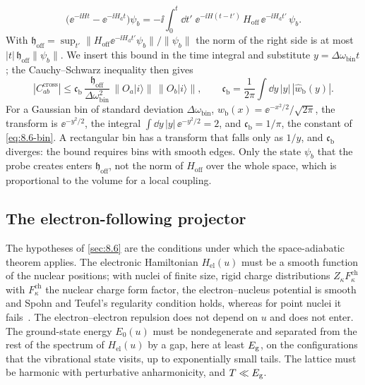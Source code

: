 \begin{equation*}
  \bigl(\ee^{-\ii Ht} - \ee^{-\ii H_{\mathrm{d}}t}\bigr)\psi_b = -\ii\int_0^t\dd t'\;\ee^{-\ii H(t - t')}\,H_{\mathrm{off}}\,\ee^{-\ii H_{\mathrm{d}}t'}\,\psi_b .
\end{equation*}
With $\mathfrak{h}_{\mathrm{off}} = \sup_{t'}\|H_{\mathrm{off}}\ee^{-\ii H_{\mathrm{d}}t'}\psi_b\|/\|\psi_b\|$ the norm of the right side is at most $|t|\,\mathfrak{h}_{\mathrm{off}}\|\psi_b\|$. We insert this bound in the time integral and substitute $y = \Delta\omega_{\mathrm{bin}}t$; the Cauchy--Schwarz inequality then gives
\begin{equation}
  |C^{\mathrm{cross}}_{ab}| \le \mathfrak{c}_{\mathrm{b}}\,\frac{\mathfrak{h}_{\mathrm{off}}}{\Delta\omega_{\mathrm{bin}}^2}\,\bigl\|O_a|i\rangle\bigr\|\,\bigl\|O_b|i\rangle\bigr\| , \qquad
  \mathfrak{c}_{\mathrm{b}} = \frac{1}{2\pi}\int\dd y\,|y|\,|\hat w_{\mathrm{b}}(y)| .
  \label{eq:D.28-lemma}
\end{equation}
For a Gaussian bin of standard deviation $\Delta\omega_{\mathrm{bin}}$, $w_{\mathrm{b}}(x) = \ee^{-x^2/2}/\sqrt{2\pi}$, the transform is $\ee^{-y^2/2}$, the integral $\int\dd y\,|y|\,\ee^{-y^2/2} = 2$, and $\mathfrak{c}_{\mathrm{b}} = 1/\pi$, the constant of \cref{eq:8.6-bin}. A rectangular bin has a transform that falls only as $1/y$, and $\mathfrak{c}_{\mathrm{b}}$ diverges: the bound requires bins with smooth edges. Only the state $\psi_b$ that the probe creates enters $\mathfrak{h}_{\mathrm{off}}$, not the norm of $H_{\mathrm{off}}$ over the whole space, which is proportional to the volume for a local coupling.

\subsection{The electron-following projector}

The hypotheses of \cref{sec:8.6} are the conditions under which the space-adiabatic theorem applies. The electronic Hamiltonian $H_{\mathrm{el}}(u)$ must be a smooth function of the nuclear positions; with nuclei of finite size, rigid charge distributions $Z_\kappa F^{\mathrm{ch}}_\kappa$ with $F^{\mathrm{ch}}_\kappa$ the nuclear charge form factor, the electron--nucleus potential is smooth and Spohn and Teufel's regularity condition holds, whereas for point nuclei it fails~\cite[Sect.~2]{spohn2001adiabatic}. The electron--electron repulsion does not depend on $u$ and does not enter. The ground-state energy $E_0(u)$ must be nondegenerate and separated from the rest of the spectrum of $H_{\mathrm{el}}(u)$ by a gap, here at least $E_{\mathrm{g}}$, on the configurations that the vibrational state visits, up to exponentially small tails. The lattice must be harmonic with perturbative anharmonicity, and $T \ll E_{\mathrm{g}}$.

